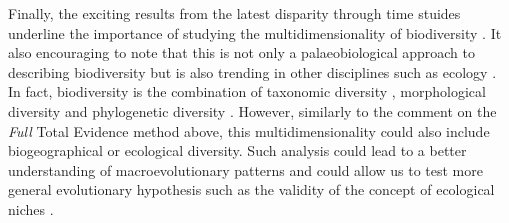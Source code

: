 Finally, the exciting results from the latest disparity through time stuides underline the importance of studying the multidimensionality of biodiversity \citep[cf. just taxonomic richness;][]{Butler2012,brusattedinosaur2012,toljagictriassic-jurassic2013,brusattegradual2014,bensonfaunal2014,Claddis,Close2015}.
It also encouraging to note that this is not only a palaeobiological approach to describing biodiversity but is also trending in other disciplines such as ecology \citep{DonohueDim}.
In fact, biodiversity is the combination of taxonomic diversity \citep[e.g.][]{Stadler12042011}, morphological diversity \citep[from cladistics or morphometrics;][]{hetherington2015cladistic} and phylogenetic diversity \citep[e.g. the evolutionary rates regimes;][]{Close2015}. %
However, similarly to the comment on the \textit{Full} Total Evidence method above, this multidimensionality could also include biogeographical or ecological diversity.
Such analysis could lead to a better understanding of macroevolutionary patterns and could allow us to test more general evolutionary hypothesis such as the validity of the concept of ecological niches \citep{pearmanniche2008}. %








